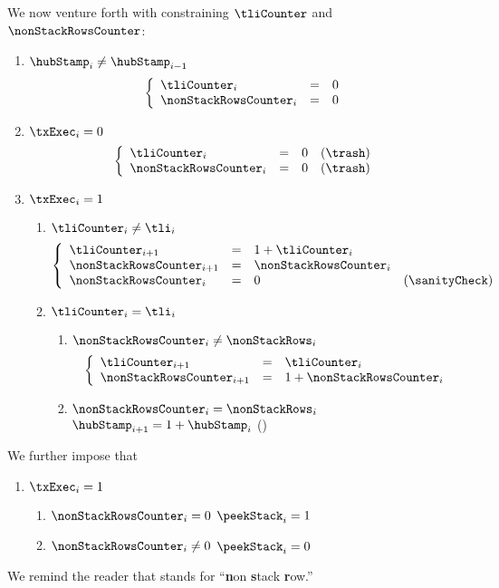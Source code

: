 We now venture forth with constraining
$\tliCounter$ and $\nonStackRowsCounter$:
\begin{enumerate}[resume]
	\item \If $\hubStamp_{i} \neq \hubStamp_{i - 1}$ \Then 
		\[
			\left\{ \begin{array}{lcl}
				\tliCounter          _{i} & = & 0 \\
				\nonStackRowsCounter _{i} & = & 0 \\
			\end{array} \right.
		\]
	\item \If $\txExec _{i} = 0$ \Then
		\[
			\left\{ \begin{array}{lclr}
				\tliCounter          _{i} & = & 0 & (\trash) \\
				\nonStackRowsCounter _{i} & = & 0 & (\trash) \\
			\end{array} \right.
		\]
	\item \If $\txExec _{i} = 1$ \Then
		\begin{enumerate}
			\item \If $\tliCounter_{i} \neq \tli_{i}$ \Then 
				\[
					\left\{ \begin{array}{lclr}
						\tliCounter          _{i + 1} & = & 1 + \tliCounter_{i}       \\
						\nonStackRowsCounter _{i + 1} & = & \nonStackRowsCounter _{i} \\
						\nonStackRowsCounter _{i    } & = & 0                          & (\sanityCheck) \\
					\end{array} \right.
				\]
			\item \If $\tliCounter_{i} = \tli_{i}$ \Then 
				\begin{enumerate}
					\item \If $\nonStackRowsCounter_{i} \neq \nonStackRows_{i}$ \Then
						\[
							\left\{ \begin{array}{lcl}
								\tliCounter          _{i + 1} & = & \tliCounter              _{i} \\
								\nonStackRowsCounter _{i + 1} & = & 1 + \nonStackRowsCounter _{i} \\
							\end{array} \right.
						\]
					\item \If $\nonStackRowsCounter_{i} = \nonStackRows_{i}$ \Then $\hubStamp_{i + 1} = 1 + \hubStamp_{i}$ (\sanityCheck)
				\end{enumerate}
		\end{enumerate}
\end{enumerate}
We further impose that
\begin{enumerate}[resume]
	\item \If $\txExec _{i} = 1$ \Then
		\begin{enumerate}
			\item \If $\nonStackRowsCounter _{i} =    0$ \Then $\peekStack _{i} = 1$
			\item \If $\nonStackRowsCounter _{i} \neq 0$ \Then $\peekStack _{i} = 0$
		\end{enumerate}
\end{enumerate}
\saNote{}
We remind the reader that  stands for ``\textbf{n}on \textbf{s}tack \textbf{r}ow.''
